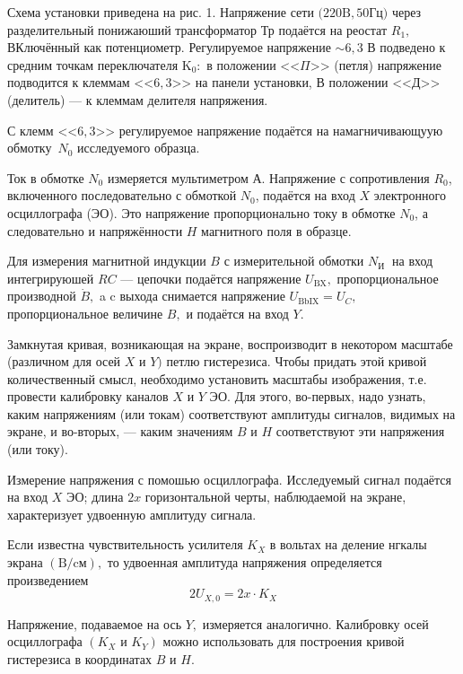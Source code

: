 \documentclass[a4paper]{article}
\theoremstyle{definition}
\theoremstyle{remark}
\begin{document}
\noindent Схема установки приведена на рис. 1. Напряжение сети $(220 \mathrm{B}, 50$Гц$)$ через разделительный понижаюший трансформатор Тр подаётся на реостат $R_{1},$ ВКлючённый как потенциометр. Регулируемое напряжение $\sim 6,3$ В подведено к средним точкам переключателя $\mathrm{K}_{0}:$ в положении <<$\Pi$>> (петля) напряжение подводится к клеммам <<$6,3$>> на панели установки, В положении <<Д>> (делитель) --- к клеммам делителя напряжения. \medskip

\noindent С клемм <<$6,3$>> регулируемое напряжение подаётся на намагничивающуую обмотку~$N_{0}$ исследуемого образца. \medskip

\noindent Ток в обмотке $N_{0}$ измеряется мультиметром А. Напряжение с сопротивления $R_{0}$, включенного последовательно с обмоткой $N_{0}$, подаётся на вход $X$ электронного осциллографа (ЭО). Это напряжение пропорционально току в обмотке $N_{0}$, а следовательно и напряжённости $H$ магнитного поля в образце. \medskip

\noindent Для измерения магнитной индукции $B$ с измерительной обмотки $N_{\text {И }}$ на вход интегрируюшей $R C$ --- цепочки подаётся напряжение $U_{\mathrm{BX}},$ пропорциональное производной $\dot{B},$ a $\mathrm{c}$ выхода снимается напряжение $U_{\mathrm{BbIX}}=U_{C},$ пропорциональное величине $B,$ и подаётся на вход $Y$. \medskip

\noindent Замкнутая кривая, возникающая на экране, воспроизводит в некотором масштабе (различном для осей $X$ и $Y)$ петлю гистерезиса. Чтобы придать этой кривой количественный смысл, необходимо установить масштабы изображения, т.е. провести калибровку каналов $X$ и $Y$ ЭО. Для этого, во-первых, надо узнать, каким напряжениям (или токам) соответствуют амплитуды сигналов, видимых на экране, и во-вторых, --- каким значениям $B$ и $H$ соответствуют эти напряжения (или току). \medskip

\noindent Измерение напряжения с помошью осциллографа. Исследуемый сигнал подаётся на вход $X$ ЭО; длина $2 x$ горизонтальной черты, наблюдаемой на экране, характеризует удвоенную амплитуду сигнала. \medskip

\noindent Если известна чувствительность усилителя $K_{X}$ в вольтах на деление нгкалы экрана $(\mathrm{B} / \mathrm{\text{cм}}),$ то удвоенная амплитуда напряжения определяется произведением
$$
2 U_{X, 0}=2 x \cdot K_{X}
$$

\noindent Напряжение, подаваемое на ось $Y,$ измеряется аналогично. Калибровку осей осциллографа $\left(K_{X}\right.$ и $\left.K_{Y}\right)$ можно использовать для построения кривой гистерезиса в координатах $B$ и $H$. \medskip
\end{document}
